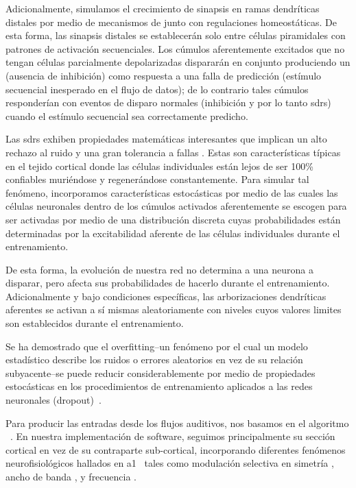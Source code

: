 {Adicionalmente, simulamos el crecimiento de sinapsis en ramas dendríticas distales por medio de mecanismos de  junto con
regulaciones homeostáticas. De esta forma, las sinapsis distales se establecerán solo entre células piramidales con patrones de activación secuenciales.
Los cúmulos aferentemente excitados que no tengan células parcialmente depolarizadas dispararán en conjunto produciendo un 
(ausencia de inhibición) como respuesta a una falla de predicción (estímulo secuencial inesperado en el flujo de datos); de lo contrario tales cúmulos responderían con eventos de disparo normales (inhibición y por lo tanto \glspl{sdr}) cuando el estímulo secuencial sea correctamente predicho.

Las \glspl{sdr} exhiben propiedades matemáticas interesantes que implican un alto rechazo al ruido y una gran tolerancia a fallas \cite{ahmad_2015}.
Estas son características típicas en el tejido cortical donde las células individuales están lejos de ser 100\% confiables muriéndose y regenerándose constantemente. Para simular tal fenómeno, incorporamos características estocásticas por medio de las cuales las células neuronales dentro de los cúmulos activados aferentemente se escogen para ser activadas por medio de una distribución discreta cuyas probabilidades están determinadas por la excitabilidad aferente de las células individuales durante el entrenamiento.

De esta forma, la evolución de nuestra red no determina a una neurona a disparar, pero afecta sus probabilidades de hacerlo durante el entrenamiento. Adicionalmente y bajo condiciones específicas, las arborizaciones dendríticas aferentes se activan a sí mismas aleatoriamente con niveles cuyos valores limites son establecidos durante el entrenamiento.

Se ha demostrado que el overfitting--un fenómeno por el cual un modelo estadístico describe los ruidos o errores aleatorios en vez de su relación subyacente--se puede reducir considerablemente por medio de propiedades estocásticas en los procedimientos de entrenamiento aplicados a las redes neuronales (dropout)~\cite{JMLR:v15:srivastava14a}.

Para producir las entradas desde los flujos auditivos, nos basamos en el algoritmo ~\cite{chi_2005}. En nuestra implementación de software, seguimos principalmente su sección cortical en vez de su contraparte sub-cortical, incorporando diferentes fenómenos neurofisiológicos hallados en \gls{a1}~\cite{wang_1995} tales como modulación selectiva en simetría \cite{shamma_1993}, ancho de banda \cite{schreiner_1990}, y frecuencia \cite{shamma_1993,heil_1992,mendelson_1985}.



}
